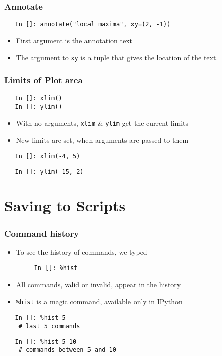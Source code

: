\begin{frame}[fragile]
  \frametitle{Annotate}
  \begin{lstlisting}
   In []: annotate("local maxima", xy=(2, -1))
  \end{lstlisting}
  \begin{itemize}
  \item First argument is the annotation text
  \item The argument to \texttt{xy} is a tuple that gives the location
    of the text. 
  \end{itemize}
\end{frame}

\begin{frame}[fragile]
  \frametitle{Limits of Plot area}
  \begin{lstlisting}
   In []: xlim()
   In []: ylim()
  \end{lstlisting}
  \begin{itemize}
  \item With no arguments, \texttt{xlim} \& \texttt{ylim} get the
    current limits
  \item New limits are set, when arguments are passed to them
  \end{itemize}
  \begin{lstlisting}
   In []: xlim(-4, 5)
  \end{lstlisting}
  \begin{lstlisting}
   In []: ylim(-15, 2)
  \end{lstlisting}
\end{frame}

\section{Saving to Scripts}

\begin{frame}[fragile]
  \frametitle{Command history}
  \begin{itemize}
  \item To see the history of commands, we typed
    \begin{lstlisting}
     In []: %hist
    \end{lstlisting}
  \item All commands, valid or invalid, appear in the history
  \item \texttt{\%hist} is a magic command, available only in IPython
  \end{itemize}
  \begin{lstlisting}
   In []: %hist 5
    # last 5 commands
  \end{lstlisting}
  \begin{lstlisting}
   In []: %hist 5-10
    # commands between 5 and 10
  \end{lstlisting}
\end{frame}

